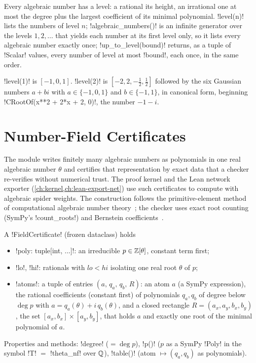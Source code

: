 Every algebraic number has a level: a rational its height, an irrational one at most the degree plus the largest coefficient of its minimal polynomial. \py!level(n)! lists the numbers of level $n$; \py!algebraic_numbers()! is an infinite generator over the levels $1,2,\ldots$ that yields each number at its first level only, so it lists every algebraic number exactly once; \py!up_to_level(bound)! returns, as a tuple of \py!Scalar! values, every number of level at most \code!bound!, each once, in the same order.

\begin{example}
\py!level(1)! is $[-1,0,1]$. \py!level(2)! is $[-2,2,-\tfrac12,\tfrac12]$ followed by the six Gaussian numbers $a+bi$ with $a\in\{-1,0,1\}$ and $b\in\{-1,1\}$, in canonical form, beginning \code!CRootOf(x**2 + 2*x + 2, 0)!, the number $-1-i$.
\end{example}

\section{Number-Field Certificates}\label{sec:algebra-numfield}

The module  writes finitely many algebraic numbers as polynomials in one real algebraic number $\theta$ and certifies that representation by exact data that a checker re-verifies without numerical trust. The proof kernel and the Lean network exporter (\cref{ch:kernel,ch:lean-export-net}) use such certificates to compute with algebraic spider weights. The construction follows the primitive-element method of computational algebraic number theory~\cite{cohen1993course}; the checker uses exact root counting (SymPy's \py!count_roots!) and Bernstein coefficients~\cite{basu2006algorithms}.

\begin{definition}\label{def:algebra-field-certificate}
A \py!FieldCertificate! (frozen dataclass) holds
\begin{itemize}
\item \py!poly: tuple[int, ...]!: an irreducible $p\in\mathbb{Z}[\theta]$, constant term first;
\item \py!lo!, \py!hi!: rationals with $\mathit{lo}<\mathit{hi}$ isolating one real root $\theta$ of $p$;
\item \py!atoms!: a tuple of entries $(a,\,q_a,\,q_b,\,R)$: an atom $a$ (a SymPy expression), the rational coefficients (constant first) of polynomials $q_a,q_b$ of degree below $\deg p$ with $a=q_a(\theta)+i\,q_b(\theta)$, and a closed rectangle $R=(a_x,a_y,b_x,b_y)$, the set $[a_x,b_x]\times[a_y,b_y]$, that holds $a$ and exactly one root of the minimal polynomial of $a$.
\end{itemize}
Properties and methods: \py!degree! ($=\deg p$), \py!p()! ($p$ as a SymPy \py!Poly! in the symbol \py!T! $=$ \code!theta_nf! over $\mathbb{Q}$), \py!table()! (atom $\mapsto(q_a,q_b)$ as polynomials).
\end{definition}


